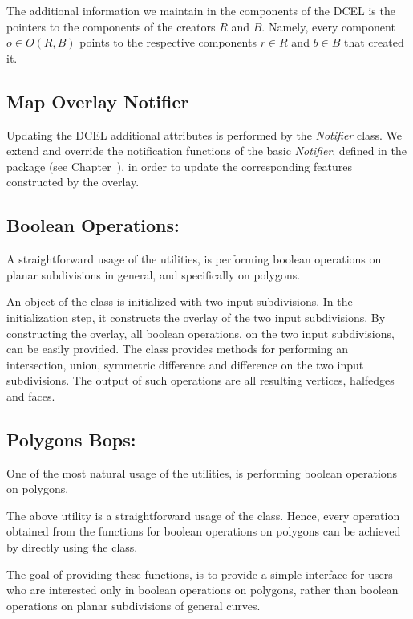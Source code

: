 \begin{ccTexOnly}
The additional information we maintain in the components of the DCEL 
is the pointers to the components of the creators $R$ and $B$.
Namely, every component $o \in O(R,B)$ points to the 
respective components $r \in R$ and $b \in B$ that created it. 


\subsection*{Map Overlay Notifier}
\label{sec:notifier}
Updating the DCEL additional attributes is performed by the {\em Notifier} class.
We extend and override the notification functions of the basic {\em Notifier}, 
defined in the  package 
(see Chapter~), 
in order to update the corresponding features constructed by the overlay. 

\subsection*{Boolean Operations:}
A straightforward usage of the  
utilities, is performing boolean operations on planar subdivisions in general, 
and specifically on polygons.

An object of the  class is initialized with 
two input subdivisions. In the initialization step, it constructs the overlay 
of the two input subdivisions. By constructing the overlay, all boolean operations, 
on the two input subdivisions, can be easily provided.
The   class provides methods for 
performing an intersection, union, symmetric difference and difference on the two 
input subdivisions. 
The output of such operations are all resulting vertices, halfedges and faces.


\subsection*{Polygons Bops:}
One of the most natural usage of 
the  utilities, 
is performing boolean operations on polygons.

The above utility is a straightforward usage of the 
class. Hence, every operation obtained from the functions 
for boolean operations on polygons can be achieved by 
directly using the  
class. 

The goal of providing these functions, is to 
provide a simple interface for users who are 
interested only in boolean operations on 
polygons, rather than boolean operations 
on planar subdivisions of general curves.


\end{ccTexOnly}
